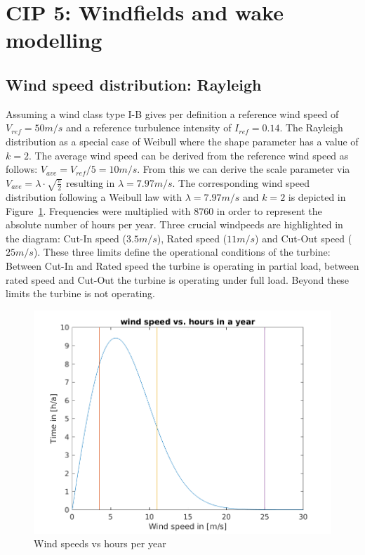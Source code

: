 \documentclass[10pt]{article}
\begin{document}
\section{CIP 5: Windfields and wake modelling}
\subsection{Wind speed distribution: Rayleigh}
Assuming a wind class type I-B gives per definition a reference wind speed of $V_{ref} = 50 m/s$ and a reference turbulence intensity of $I_{ref}=0.14$. The Rayleigh distribution as a special case of Weibull where the shape parameter has a value of $k=2$. The average wind speed can be derived from the reference wind speed as follows: $V_{ave}=V_{ref}/5 =10 m/s$. From this we can derive the scale parameter via $V_{ave} =  \lambda \cdot \sqrt{\frac{\pi}{2}}$ resulting in $\lambda = 7.97 m/s$. The corresponding wind speed distribution following a Weibull law with $\lambda = 7.97 m/s$ and $k=2$ is depicted in Figure~\ref{fig:rayleigh}. Frequencies were multiplied with 8760 in order to represent the absolute number of hours per year. Three crucial windpeeds are highlighted in the diagram: Cut-In speed ($3.5 m/s$), Rated speed ($11 m/s$) and Cut-Out speed ($25 m/s$). These three limits define the operational conditions of the turbine: Between Cut-In and Rated speed the turbine is operating in partial load, between rated speed and Cut-Out the turbine is operating under full load. Beyond these limits the turbine is not operating.

\begin{figure}[H]
\centering
\includegraphics[width=1\linewidth]{../CIP_5/CIP_Tutorial_5_-_Windfield_and_wake_simulation/windspeed_vs_hours_year.png}
\caption{Wind speeds vs hours per year}
\label{fig:rayleigh}
\end{figure} 
\end{document}
